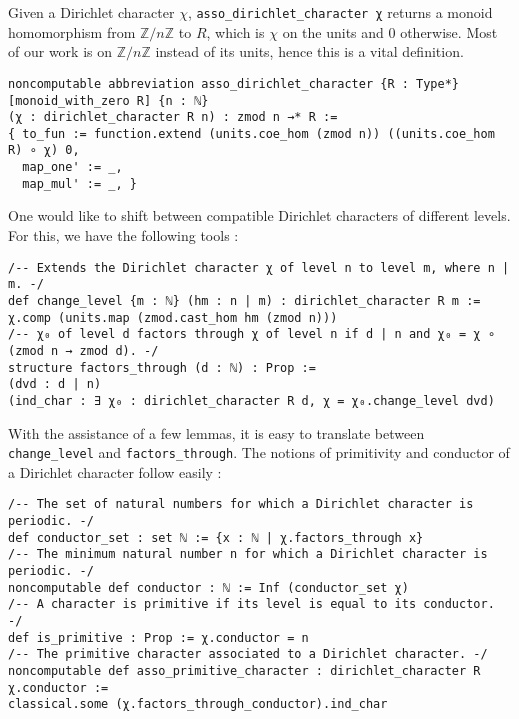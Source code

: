 \documentclass[a4paper,UKenglish,cleveref, autoref, thm-restate]{lipics-v2021}
\newcommand{\lean}[1]{\texttt{#1}\xspace} %
\begin{document}
Given a Dirichlet character $\chi$, \lean{asso\_dirichlet\_character χ} returns a monoid homomorphism from $\mathbb{Z}/n \mathbb{Z}$ 
to $R$, which is $\chi$ on the units and 0 otherwise. Most of our work is on $\mathbb{Z}/n \mathbb{Z}$ instead of its units, hence this 
is a vital definition. 
\begin{lstlisting}
noncomputable abbreviation asso_dirichlet_character {R : Type*} [monoid_with_zero R] {n : ℕ} 
(χ : dirichlet_character R n) : zmod n →* R :=
{ to_fun := function.extend (units.coe_hom (zmod n)) ((units.coe_hom R) ∘ χ) 0,
  map_one' := _,
  map_mul' := _, }
\end{lstlisting}
One would like to shift between compatible Dirichlet characters of different levels. For this, we have the following tools : 
\begin{lstlisting}
/-- Extends the Dirichlet character χ of level n to level m, where n | m. -/
def change_level {m : ℕ} (hm : n | m) : dirichlet_character R m := 
χ.comp (units.map (zmod.cast_hom hm (zmod n)))
/-- χ₀ of level d factors through χ of level n if d | n and χ₀ = χ ∘ (zmod n → zmod d). -/
structure factors_through (d : ℕ) : Prop :=
(dvd : d | n)
(ind_char : ∃ χ₀ : dirichlet_character R d, χ = χ₀.change_level dvd)
\end{lstlisting}
With the assistance of a few lemmas, it is easy to translate between \lean{change\_level} and \lean{factors\_through}. The notions of primitivity 
and conductor of a Dirichlet character follow easily : 
\begin{lstlisting}
/-- The set of natural numbers for which a Dirichlet character is periodic. -/
def conductor_set : set ℕ := {x : ℕ | χ.factors_through x}
/-- The minimum natural number n for which a Dirichlet character is periodic. -/
noncomputable def conductor : ℕ := Inf (conductor_set χ)
/-- A character is primitive if its level is equal to its conductor. -/
def is_primitive : Prop := χ.conductor = n
/-- The primitive character associated to a Dirichlet character. -/
noncomputable def asso_primitive_character : dirichlet_character R χ.conductor :=
classical.some (χ.factors_through_conductor).ind_char
\end{lstlisting}
\end{document}

